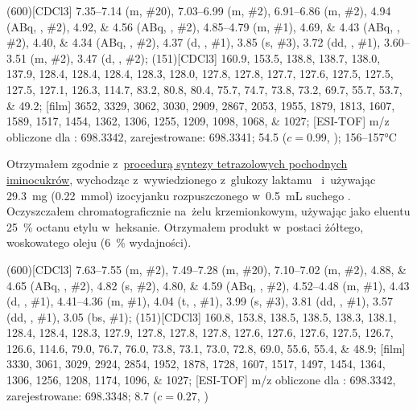 \begin{fullexp}
  \NMR(600)[CDCl3] \numrange{7.35}{7.14} (m, \#{20}), \numrange{7.03}{6.99} (m, \#{2}), \numrange{6.91}{6.86} (m, \#{2}), \num{4.94} (ABq, , \#{2}), \numlist{4.92;4.56} (ABq, , \#{2}), \numrange{4.85}{4.79} (m, \#{1}), \numlist{4.69;4.43} (ABq, , \#{2}), \numlist{4.40;4.34} (ABq, , \#{2}), \num{4.37} (d, , \#{1}), \num{3.85} (s, \#{3}), \num{3.72} (dd, , \#{1}), \numrange{3.60}{3.51} (m, \#{2}), \num{3.47} (d, , \#{2});
  (151)[CDCl3] \numlist{160.9; 153.5; 138.8; 138.7; 138.0; 137.9; 128.4; 128.4; 128.4; 128.3; 128.0; 127.8; 127.8; 127.7; 127.6; 127.5; 127.5; 127.5; 127.1; 126.3; 114.7; 83.2; 80.8; 80.4; 75.7; 74.7; 73.8; 73.2; 69.7; 55.7; 53.7; 49.2};
  [film] \numlist{3652; 3329; 3062; 3030; 2909; 2867; 2053; 1955; 1879; 1813; 1607; 1589; 1517; 1454; 1362; 1306; 1255; 1209; 1098; 1068; 1027};
  [ESI-TOF] m/z obliczone dla : \num{698.3342}, zarejestrowane: \num{698.3341};
  \data{[$\alpha^{23}_D$]~$=$} \num{54.5} ($c = 0.99$, );
   \numrange{156}{157}\si{\celsius}
\end{fullexp}

Otrzymałem zgodnie z~\hyperref[experimental:sugars:schwartz]{procedurą syntezy tetrazolowych
  pochodnych iminocukrów}, wychodząc z~wywiedzionego z~glukozy laktamu~
  i~używając \SI{29.3}{\milli\gram} (\SI{0.22}{\milli\mol}) izocyjanku 
  rozpuszczonego w~\SI{0.5}{\milli\liter} suchego .
Oczyszczałem chromatograficznie na~żelu krzemionkowym,
  używając jako eluentu \SI{25}{\percent} octanu etylu w~heksanie.
Otrzymałem produkt w~postaci żółtego, woskowatego oleju (\SI{6}{\percent} wydajności).

\begin{fullexp}
  \NMR(600)[CDCl3] \numrange{7.63}{7.55} (m, \#{2}), \numrange{7.49}{7.28} (m, \#{20}), \numrange{7.10}{7.02} (m, \#{2}), \numlist{4.88;4.65} (ABq, , \#{2}), \num{4.82} (s, \#{2}), \numlist{4.80;4.59} (ABq, , \#{2}), \numrange{4.52}{4.48} (m, \#{1}), \num{4.43} (d, , \#{1}), \numrange{4.41}{4.36} (m, \#{1}), \num{4.04} (t, , \#{1}), \num{3.99} (s, \#{3}), \num{3.81} (dd, , \#{1}), \num{3.57} (dd, , \#{1}), \num{3.05} (bs, \#{1});
  (151)[CDCl3] \numlist{160.8; 153.8; 138.5; 138.5; 138.3; 138.1; 128.4; 128.4; 128.3; 127.9; 127.8; 127.8; 127.8; 127.6; 127.6; 127.6; 127.5; 126.7; 126.6; 114.6; 79.0; 76.7; 76.0; 73.8; 73.1; 73.0; 72.8; 69.0; 55.6; 55.4; 48.9};
  [film] \numlist{3330; 3061; 3029; 2924; 2854; 1952; 1878; 1728; 1607; 1517; 1497; 1454; 1364; 1306; 1256; 1208; 1174; 1096; 1027};
  [ESI-TOF] m/z obliczone dla : \num{698.3342}, zarejestrowane: \num{698.3348};
  \data{[$\alpha^{23}_D$]~$=$} \num{8.7} ($c = 0.27$, )
\end{fullexp}

